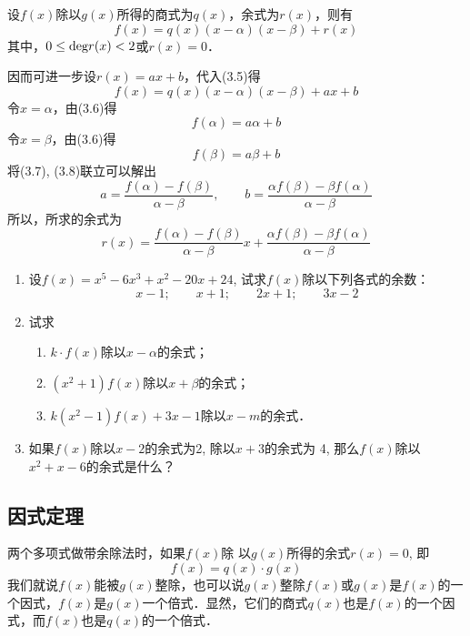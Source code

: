 \begin{solution}
设$f(x)$除以$g(x)$所得的商式为$q(x)$，余式为$r(x)$，则有
\begin{equation}
f(x)=q(x)(x-\alpha)(x-\beta)+r(x)
\end{equation}
    其中，$0\le {\rm deg}r(x)<2$或$r(x)=0$．

因而可进一步设$r(x)=ax+b$，代入(3.5)得
\begin{equation}
    f(x)=q(x)(x-\alpha)(x-\beta)+ax+b
\end{equation}
令$x=\alpha$，由(3.6)得
\begin{equation}
    f(\alpha)=a\alpha+b
\end{equation}
令$x=\beta$，由(3.6)得
\begin{equation}
    f(\beta)=a\beta+b
\end{equation}
将(3.7), (3.8)联立可以解出
\[a=\frac{f(\alpha)-f(\beta)}{\alpha-\beta},\qquad b=\frac{\alpha f(\beta)-\beta f(\alpha)}{\alpha-\beta}\]
所以，所求的余式为
\[r(x)=\frac{f(\alpha)-f(\beta)}{\alpha-\beta}x+\frac{\alpha f(\beta)-\beta f(\alpha)}{\alpha-\beta}\]
\end{solution}

\begin{ex}
\begin{enumerate}
\item 设$f(x)=x^5-6x^3+x^2-20x+24$, 试求$f(x)$除以下列各式的余数：
\[x-1;\qquad  x+1;\qquad  2x+1;\qquad  3x-2\]
\item 试求
\begin{enumerate}
\item $k\cdot f(x)$除以$x-\alpha$的余式；
\item $(x^2+1)f(x)$除以$x+\beta$的余式；
\item $k(x^2-1)f(x)+3x-1$除以$x-m$的余式．
\end{enumerate}

\item 如果$f(x)$除以$x-2$的余式为2, 除以$x+3$的余式为
4, 那么$f(x)$除以$x^2+x-6$的余式是什么？
\end{enumerate}
\end{ex}



\subsection{因式定理}

两个多项式做带余除法时，如果$f(x)$除
以$g(x)$所得的余式$r(x)=0$, 即
\[f (x) =q (x) \cdot g (x) \]
我们就说$f(x)$能被$g(x)$整除，也可以说$g(x)$整除$f(x)$或$g(x)$是$f(x)$的一个因式，$f(x)$是$g(x)$一个倍式．显然，它们的商式$q(x)$也是$f(x)$的一个因式，而$f(x)$也是$q(x)$的一个倍式．

